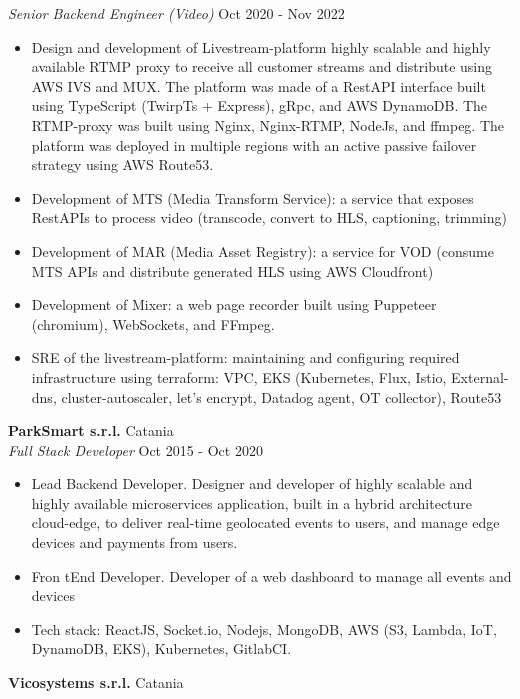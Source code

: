 \documentclass[a4paper]{article}
\begin{document}
\textit{Senior Backend Engineer (Video)} \hfill Oct 2020 - Nov 2022\\
\vspace{-1mm}
\begin{itemize} \itemsep 1pt
	\item Design and development of Livestream-platform highly scalable and highly available RTMP proxy to receive all customer streams and distribute using AWS IVS and MUX. The platform was made of a RestAPI interface built using TypeScript (TwirpTs + Express), gRpc, and AWS DynamoDB. The RTMP-proxy was built using Nginx, Nginx-RTMP, NodeJs, and ffmpeg. The platform was deployed in multiple regions with an active passive failover strategy using AWS Route53.
	\item Development of MTS (Media Transform Service): a service that exposes RestAPIs to process video (transcode, convert to HLS, captioning, trimming)
	\item Development of MAR (Media Asset Registry): a service for VOD (consume MTS APIs and distribute generated HLS using AWS Cloudfront)
	\item Development of Mixer: a web page recorder built using Puppeteer (chromium), WebSockets, and FFmpeg.
	\item SRE of the livestream-platform: maintaining and configuring required infrastructure using terraform: VPC, EKS (Kubernetes, Flux, Istio, External-dns, cluster-autoscaler, let’s encrypt, Datadog agent, OT collector), Route53
\end{itemize}
\textbf{ParkSmart s.r.l.} \hfill Catania\\
\textit{Full Stack Developer} \hfill Oct 2015 - Oct 2020\\
\vspace{-1mm}
\begin{itemize} \itemsep 1pt
	\item Lead Backend Developer. Designer and developer of highly scalable and highly available microservices application, built in a hybrid architecture cloud-edge, to deliver real-time geolocated events to users, and manage edge devices and payments from users.
	\item Fron tEnd Developer. Developer of a web dashboard to manage all events and devices
	\item Tech stack: ReactJS, Socket.io, Nodejs, MongoDB, AWS (S3, Lambda, IoT, DynamoDB, EKS), Kubernetes, GitlabCI.
\end{itemize}
\textbf{Vicosystems s.r.l.} \hfill Catania\\
\end{document}
